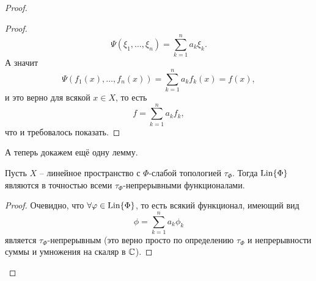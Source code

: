 \begin{proof}
\begin{enumerate}
\begin{proof}
            \[
                \Psi(\xi_1, \ldots, \xi_n) = \sum_{k = 1}^{n} a_k \xi_k.
            \]
            А значит
            \[
                \Psi(f_1(x), \ldots, f_n(x)) = \sum_{k = 1}^{n} a_k f_k(x) = f(x),
            \]
            и это верно для всякой $x \in X$, то есть
            \[
                f = \sum_{k = 1}^{n} a_k f_k,
            \]
            что и требовалось показать.
        \end{proof}
        А теперь докажем ещё одну лемму.
        \begin{lemma}\label{lemma:about-continious-funcitonals}
            Пусть $X$ -- линейное пространство с $\Phi$-слабой топологией $\tau_{\Phi}$.
            Тогда $\operatorname{Lin}\{\Phi\}$ являются в точностью всеми $\tau_{\Phi}$-непрерывными функционалами.
        \end{lemma}
        \begin{proof}
            Очевидно, что $\forall \varphi \in \operatorname{Lin}\{\Phi\}$, то есть всякий функционал, имеющий вид
            \[
                \phi = \sum_{k = 1}^{n} a_k \phi_k
            \]
            является $\tau_{\Phi}$-непрерывным (это верно просто по определению $\tau_{\Phi}$ и непрерывности суммы и умножения на скаляр в $\mathbb{C}$).


\end{proof}
\end{enumerate}
\end{proof}
